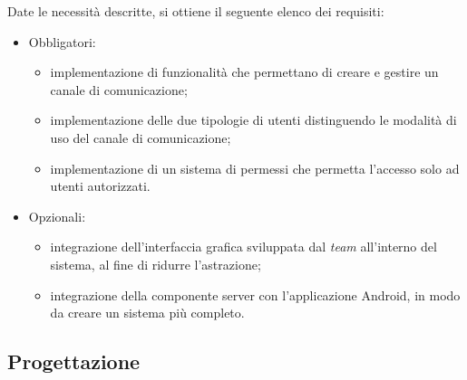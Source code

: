       Date le necessità descritte, si ottiene il seguente elenco dei requisiti:
      \begin{itemize}
        \item Obbligatori:
          \begin{itemize}
            \item implementazione di funzionalità che permettano di creare e gestire un canale di comunicazione;
            \item implementazione delle due tipologie di utenti distinguendo le modalità di uso del canale di comunicazione;
            \item implementazione di un sistema di permessi che permetta l'accesso solo ad utenti autorizzati.
          \end{itemize}
        \item Opzionali:
          \begin{itemize}
            \item integrazione dell'interfaccia grafica sviluppata dal \textit{team} all'interno del sistema, al fine di ridurre l'astrazione;
            \item integrazione della componente server con l'applicazione Android, in modo da creare un sistema più completo.
          \end{itemize}
      \end{itemize}
    \subsection{Progettazione}
